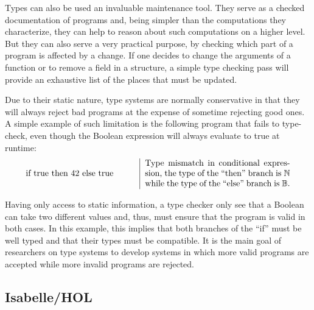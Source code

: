 Types can also be used an invaluable maintenance tool. They serve as a checked documentation of
programs and, being simpler than the computations they characterize, they can help to reason about
such computations on a higher level. But they can also serve a very practical purpose, by checking
which part of a program is affected by a change. If one decides to change the arguments of a
function or to remove a field in a structure, a simple type checking pass will provide an exhaustive
list of the places that must be updated.

Due to their static nature, type systems are normally conservative in that they will always reject
bad programs at the expense of sometime rejecting good ones. A simple example of such limitation is
the following program that fails to type-check, even though the Boolean expression will always
evaluate to true at runtime:
\begin{displaymath}
  \begin{tabular}{m{4.5cm} | m{6cm}}
    if true then 42 else true
    & Type mismatch in conditional expression, the type of the ``then'' branch is $\mathbb{N}$ while
    the type of the ``else'' branch is $\mathbb{B}$.
  \end{tabular}
\end{displaymath}

Having only access to static information, a type checker only see that a Boolean can take two
different values and, thus, must ensure that the program is valid in both cases. In this example,
this implies that both branches of the ``if'' must be well typed and that their types must be
compatible. It is the main goal of researchers on type systems to develop systems in which more
valid programs are accepted while more invalid programs are rejected.

\subsection{Isabelle/HOL}


